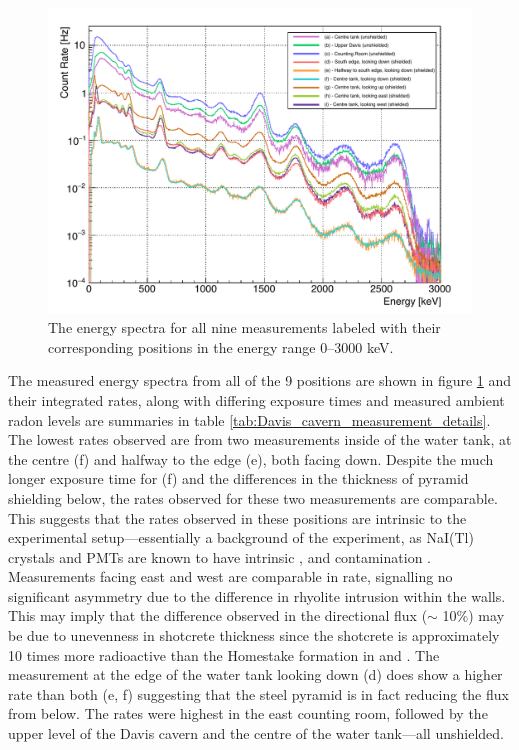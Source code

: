 \begin{figure}[t!]
    \centering
    \includegraphics[scale=0.80]{Chapter_3/Figures/Davis_cavern_spectra.pdf}
    \caption[The energy spectra for all nine measurements labeled with their corresponding positions in the energy range 0–3000 keV.]
    {The energy spectra for all nine measurements labeled with their corresponding positions in the energy range 0–3000 keV.}
    \label{fig:davis_cavern_spectra}
\end{figure}
%
The measured energy spectra from all of the 9 positions are shown in figure \ref{fig:davis_cavern_spectra} and their integrated rates, along with differing exposure times and measured ambient radon levels are summaries in table \ref{tab:Davis_cavern_measurement_details}. The lowest rates observed are from two measurements inside of the water tank, at the centre (f) and halfway to the edge (e), both facing down. Despite the much longer exposure time for (f) and the differences in the thickness of pyramid shielding below, the rates observed for these two measurements are comparable. This suggests that the rates observed in these positions are intrinsic to the experimental setup---essentially a background of the experiment, as NaI(Tl) crystals and PMTs are known to have intrinsic \KFZ{}, \UTTE{} and \ThTTT{} contamination \cite{Kim:2014toa}. Measurements facing east and west are comparable in rate, signalling no significant asymmetry due to the difference in rhyolite intrusion within the walls. This may imply that the difference observed in the directional flux ($\sim$ 10\%) may be due to unevenness in shotcrete thickness since the shotcrete is approximately 10 times more radioactive than the Homestake formation in \UTTE{} and \ThTTT{}. The measurement at the edge of the water tank looking down (d) does show a higher rate than both (e, f) suggesting that the steel pyramid is in fact reducing the flux from below. The rates were highest in the east counting room, followed by the upper level of the Davis cavern and the centre of the water tank---all unshielded.

